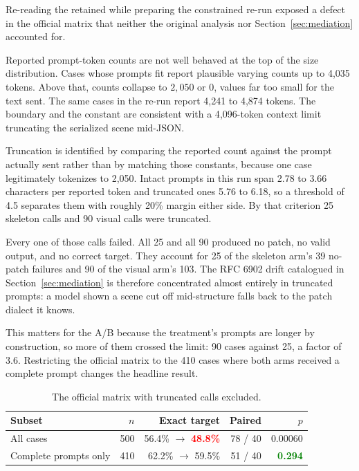 \documentclass[10pt,a4paper]{article}
\newcommand{\good}[1]{\textcolor{green}{\textbf{#1}}}
\newcommand{\bad}[1]{\textcolor{red}{\textbf{#1}}}
\newcommand{\code}[1]{\texttt{\detokenize{#1}}}
\begin{document}
Re-reading the retained \code{model_call_details} while preparing the
constrained re-run exposed a defect in the official matrix that neither the
original analysis nor Section~\ref{sec:mediation} accounted for.

Reported prompt-token counts are not well behaved at the top of the size
distribution. Cases whose prompts fit report plausible varying counts up to
4{,}035 tokens. Above that, counts collapse to \(2{,}050\) or \(0\), values
far too small for the text sent. The same cases in the re-run report 4{,}241
to 4{,}874 tokens. The boundary and the constant are consistent with a
4{,}096-token context limit truncating the serialized scene mid-JSON.

Truncation is identified by comparing the reported count against the prompt
actually sent rather than by matching those constants, because one case
legitimately tokenizes to 2{,}050. Intact prompts in this run span 2.78 to
3.66 characters per reported token and truncated ones 5.76 to 6.18, so a
threshold of 4.5 separates them with roughly 20\% margin either side. By that
criterion 25 skeleton calls and 90 visual calls were truncated.

Every one of those calls failed. All 25 and all 90 produced no patch, no valid
output, and no correct target. They account for 25 of the skeleton arm's 39
no-patch failures and 90 of the visual arm's 103. The RFC 6902 drift
catalogued in Section~\ref{sec:mediation} is therefore concentrated almost
entirely in truncated prompts: a model shown a scene cut off mid-structure
falls back to the patch dialect it knows.

This matters for the A/B because the treatment's prompts are longer by
construction, so more of them crossed the limit: 90 cases against 25, a factor
of 3.6. Restricting the official matrix to the 410 cases where both arms
received a complete prompt changes the headline result.

\begin{table}[H]
\centering
\caption{The official matrix with truncated calls excluded.}
\begin{tabular}{@{}lrrrr@{}}
\toprule
\textbf{Subset} & \textbf{\(n\)} & \textbf{Exact target} &
\textbf{Paired} & \textbf{\(p\)}\\
\midrule
All cases & 500 & 56.4\% \(\rightarrow\) \bad{48.8\%} & 78 / 40 & 0.00060\\
Complete prompts only & 410 & 62.2\% \(\rightarrow\) 59.5\% & 51 / 40 & \good{0.294}\\
\bottomrule
\end{tabular}
\end{table}
\end{document}
